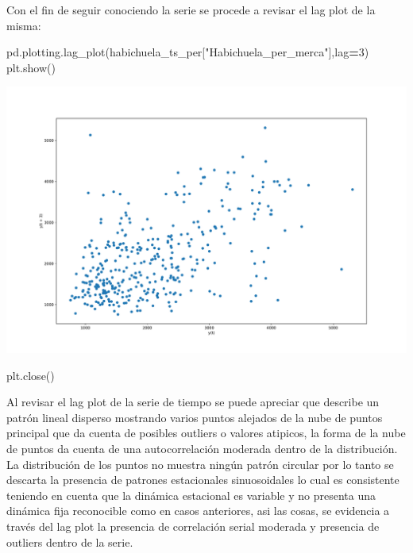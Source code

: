 \documentclass[
]{book}
\newenvironment{Shaded}{\begin{snugshade}}{\end{snugshade}}
\newcommand{\DecValTok}[1]{\textcolor[rgb]{0.00,0.00,0.81}{#1}}
\newcommand{\NormalTok}[1]{#1}
\newcommand{\OperatorTok}[1]{\textcolor[rgb]{0.81,0.36,0.00}{\textbf{#1}}}
\newcommand{\StringTok}[1]{\textcolor[rgb]{0.31,0.60,0.02}{#1}}
\begin{document}
Con el fin de seguir conociendo la serie se procede a revisar el lag plot de la misma:

\begin{Shaded}
\begin{Highlighting}[]

\NormalTok{pd.plotting.lag\_plot(habichuela\_ts\_per[}\StringTok{"Habichuela\_per\_merca"}\NormalTok{],lag}\OperatorTok{=}\DecValTok{3}\NormalTok{)}
\NormalTok{plt.show()}
\end{Highlighting}
\end{Shaded}

\includegraphics{bookdown-demo_files/figure-latex/unnamed-chunk-106-87.pdf}

\begin{Shaded}
\begin{Highlighting}[]
\NormalTok{plt.close()}
\end{Highlighting}
\end{Shaded}

Al revisar el lag plot de la serie de tiempo se puede apreciar que describe un patrón lineal disperso mostrando varios puntos alejados de la nube de puntos principal que da cuenta de posibles outliers o valores atipicos, la forma de la nube de puntos da cuenta de una autocorrelación moderada dentro de la distribución. La distribución de los puntos no muestra ningún patrón circular por lo tanto se descarta la presencia de patrones estacionales sinuosoidales lo cual es consistente teniendo en cuenta que la dinámica estacional es variable y no presenta una dinámica fija reconocible como en casos anteriores, asi las cosas, se evidencia a través del lag plot la presencia de correlación serial moderada y presencia de outliers dentro de la serie.
\end{document}
